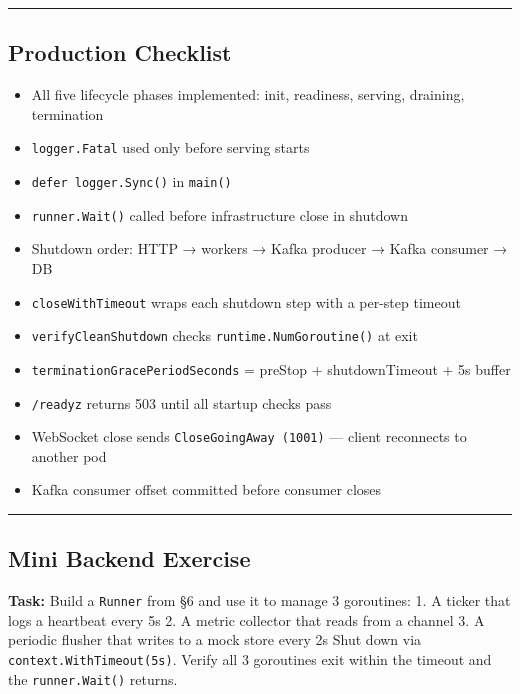 \documentclass[
]{article}
\providecommand{\tightlist}{%
  \setlength{\itemsep}{0pt}\setlength{\parskip}{0pt}}
\begin{document}
\begin{center}\rule{0.5\linewidth}{0.5pt}\end{center}

\hypertarget{production-checklist-2}{%
\subsection{Production Checklist}\label{production-checklist-2}}

\begin{itemize}
\tightlist
\item[$\square$]
  All five lifecycle phases implemented: init, readiness, serving,
  draining, termination
\item[$\square$]
  \texttt{logger.Fatal} used only before serving starts
\item[$\square$]
  \texttt{defer\ logger.Sync()} in \texttt{main()}
\item[$\square$]
  \texttt{runner.Wait()} called before infrastructure close in shutdown
\item[$\square$]
  Shutdown order: HTTP → workers → Kafka producer → Kafka consumer → DB
\item[$\square$]
  \texttt{closeWithTimeout} wraps each shutdown step with a per-step
  timeout
\item[$\square$]
  \texttt{verifyCleanShutdown} checks \texttt{runtime.NumGoroutine()} at
  exit
\item[$\square$]
  \texttt{terminationGracePeriodSeconds} = preStop + shutdownTimeout +
  5s buffer
\item[$\square$]
  \texttt{/readyz} returns 503 until all startup checks pass
\item[$\square$]
  WebSocket close sends \texttt{CloseGoingAway\ (1001)} --- client
  reconnects to another pod
\item[$\square$]
  Kafka consumer offset committed before consumer closes
\end{itemize}

\begin{center}\rule{0.5\linewidth}{0.5pt}\end{center}

\hypertarget{mini-backend-exercise}{%
\subsection{Mini Backend Exercise}\label{mini-backend-exercise}}

\textbf{Task:} Build a \texttt{Runner} from §6 and use it to manage 3
goroutines: 1. A ticker that logs a heartbeat every 5s 2. A metric
collector that reads from a channel 3. A periodic flusher that writes to
a mock store every 2s Shut down via \texttt{context.WithTimeout(5s)}.
Verify all 3 goroutines exit within the timeout and the
\texttt{runner.Wait()} returns.
\end{document}
